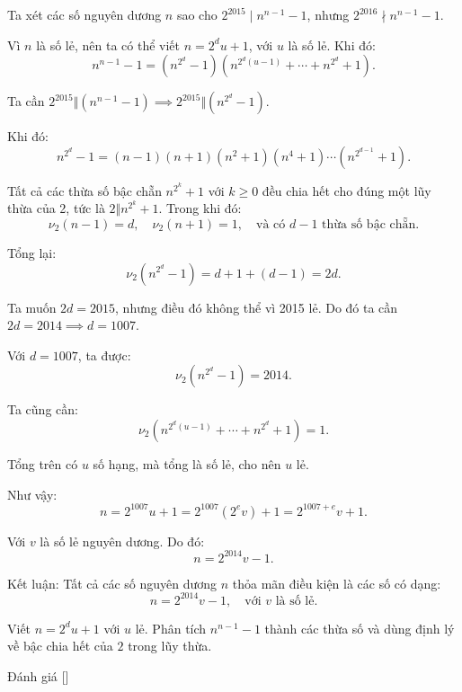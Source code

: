 \ifshowproblemandsoln
\ifshowproblem{}
\fi

\ifshowsoln
\begin{soln}\footnotemark
    Ta xét các số nguyên dương \( n \) sao cho \( 2^{2015} \mid n^{n-1} - 1 \), nhưng \( 2^{2016} \nmid n^{n-1} - 1 \).

    Vì \( n \) là số lẻ, nên ta có thể viết \( n = 2^d u + 1 \), với \( u \) là số lẻ. Khi đó:
    \[
        n^{n - 1} - 1 = (n^{2^d} - 1)\left(n^{2^d(u - 1)} + \cdots + n^{2^d} + 1\right).
    \]

    Ta cần \( 2^{2015} \Vert (n^{n - 1} - 1) \implies 2^{2015} \Vert (n^{2^d} - 1) \).

    Khi đó:
    \[
        n^{2^d} - 1 = (n - 1)(n + 1)(n^2 + 1)(n^4 + 1) \cdots (n^{2^{d - 1}} + 1).
    \]

    Tất cả các thừa số bậc chẵn \( n^{2^k} + 1 \) với \( k \ge 0 \) đều chia hết cho đúng một lũy thừa của 2, tức là \( 2 \Vert n^{2^k} + 1 \). Trong khi đó:
    \[
        \nu_2(n - 1) = d,\quad \nu_2(n + 1) = 1,\quad \text{và có } d - 1 \text{ thừa số bậc chẵn}.
    \]

    Tổng lại:
    \[
        \nu_2(n^{2^d} - 1) = d + 1 + (d - 1) = 2d.
    \]
    
    Ta muốn \( 2d = 2015 \), nhưng điều đó không thể vì 2015 lẻ. Do đó ta cần \( 2d = 2014 \implies d = 1007 \).

    Với \( d = 1007 \), ta được:
    \[
        \nu_2(n^{2^d} - 1) = 2014.
    \]

    Ta cũng cần:
    \[
        \nu_2\left(n^{2^d(u - 1)} + \cdots + n^{2^d} + 1\right) = 1.
    \]

    Tổng trên có \( u \) số hạng, mà tổng là số lẻ, cho nên \( u \) lẻ.

    Như vậy:
    \[
        n = 2^{1007} u + 1 = 2^{1007}(2^e v) + 1 = 2^{1007 + e} v + 1.
    \]

    Với \( v \) là số lẻ nguyên dương. Do đó:
    \[
        n = 2^{2014} v - 1.
    \]

    Kết luận: Tất cả các số nguyên dương \( n \) thỏa mãn điều kiện là các số có dạng:
    \[
        \boxed{n = 2^{2014} v - 1}, \quad \text{với } v \text{ là số lẻ}.
    \]
\end{soln}
\fi

\ifshowhint
\begin{hint*}
    Viết \( n = 2^d u + 1 \) với \( u \) lẻ. Phân tích \( n^{n-1} - 1 \) thành các thừa số và dùng định lý về bậc chia hết của \( 2 \) trong lũy thừa.
\end{hint*}
\fi

\ifshowremark
\begin{remark*}
    Đánh giá [\textbf{}]
\end{remark*}
\newpage
\fi